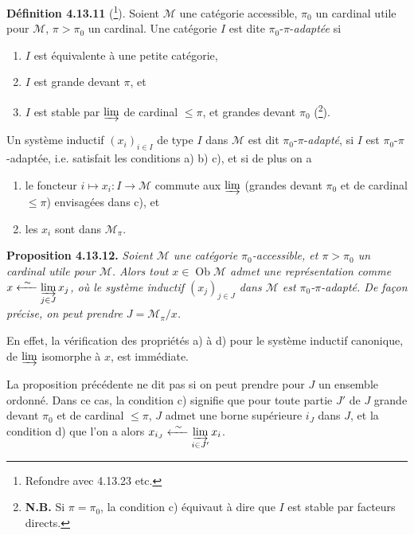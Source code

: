 \documentclass[11pt]{article}
\newcommand{\printedpage}[1]{\marginpar{\footnotesize p.~#1}}
\newcommand{\msp}[1]{\marginpar{\footnotesize [#1]}}
\newcommand{\Ob}{\operatorname{Ob}}
\newcommand{\ilim}{\varinjlim\limits}
\begin{document}
\printedpage{114}

\msp{page 303}\noindent\textbf{Définition 4.13.11} (\footnote[132]{Refondre avec 4.13.23 etc.}). Soient $\mathcal{M}$ une catégorie accessible, $\pi_0$ un cardinal utile pour $\mathcal{M}$, $\pi > \pi_0$ un cardinal. Une catégorie $I$ est dite $\pi_0$-$\pi$-\textit{adaptée} si
\begin{enumerate}
\item[a)] $I$ est équivalente à une petite catégorie,
\item[b)] $I$ est grande devant $\pi$, et
\item[c)] $I$ est stable par $\varinjlim$ de cardinal $\leqslant \pi$, et grandes devant $\pi_0$ (\footnote[133]{\textbf{N.B.} Si $\pi = \pi_0$, la condition c) équivaut à dire que $I$ est stable par facteurs directs.}).
\end{enumerate}
\noindent Un système inductif $(x_i)_{i\in I}$ de type $I$ dans $\mathcal{M}$ est dit $\pi_0$-$\pi$-\textit{adapté}, si $I$ est $\pi_0$-$\pi$-adaptée, i.e. satisfait les conditions a) b) c), et si de plus on a
\begin{enumerate}
\item[d)] le foncteur $i \longmapsto x_i : I \longrightarrow \mathcal{M}$ commute aux $\varinjlim$ (grandes devant $\pi_0$ et de cardinal $\leqslant \pi$) envisagées dans c), et
\item[e)] les $x_i$ sont dans $\mathcal{M}_\pi$.
\end{enumerate}

\noindent\textbf{Proposition 4.13.12.} \textit{Soient $\mathcal{M}$ une catégorie $\pi_0$-accessible, et $\pi > \pi_0$ un cardinal utile pour $\mathcal{M}$. Alors tout $x \in \Ob\mathcal{M}$ admet une représentation comme $x \xleftarrow{\ \sim\ } \ilim_{j\in J} x_j$, où le système inductif $(x_j)_{j\in J}$ dans $\mathcal{M}$ est $\pi_0$-$\pi$-adapté. De façon précise, on peut prendre $J = \mathcal{M}_\pi/x$.}

\msp{page 304}\noindent En effet, la vérification des propriétés a) à d) pour le système inductif canonique, de $\varinjlim$ isomorphe à $x$, est immédiate.

La proposition précédente ne dit pas si on peut prendre pour $J$ un ensemble ordonné. Dans ce cas, la condition c) signifie que pour toute partie $J'$ de $J$ grande devant $\pi_0$ et de cardinal $\leqslant \pi$, $J$ admet une borne supérieure $i_J$ dans $J$, et la condition d) que l'on a alors $x_{i_J} \xleftarrow{\ \sim\ } \ilim_{i\in J'} x_i$.
\end{document}
